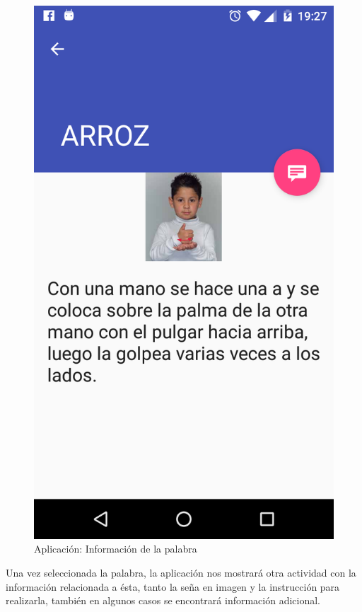 \begin{figure}[H]
	\centering
	\includegraphics[scale = 0.2]{figures/app11}
	\caption{Aplicación: Información de la palabra}
	\label{fig:app11}
\end{figure}

Una vez seleccionada la palabra, la aplicación nos mostrará otra actividad con la información relacionada a ésta, tanto la seña en imagen y la instrucción para realizarla, también en algunos casos se encontrará información adicional.

